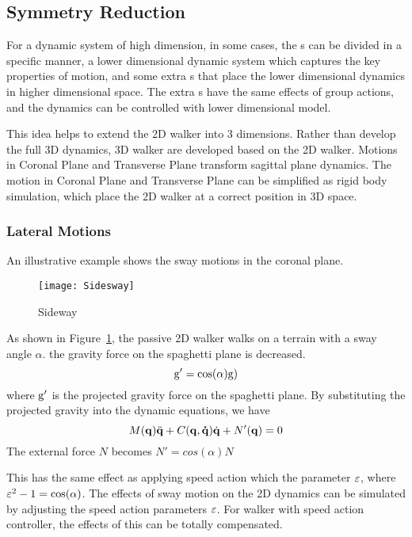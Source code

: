 {\subsection{Symmetry Reduction}
For a dynamic system of high dimension, in some cases, the {\dof}s can be divided in a specific manner,
a lower dimensional dynamic system which captures the key properties of motion, 
and some extra {\dof}s that place the lower dimensional dynamics in higher dimensional space.
The extra {\dof}s have the same effects of group actions, and the dynamics can be controlled with lower dimensional model.



This idea helps to extend the 2D walker into 3 dimensions.
Rather than develop the full 3D dynamics, 3D walker are developed based on the 2D walker.
Motions in Coronal Plane and Transverse Plane transform sagittal plane dynamics.
The motion in Coronal Plane and Transverse Plane can be simplified as rigid body simulation, which place the 2D walker at a correct position in 3D space.

\subsubsection*{Lateral Motions}
An illustrative example shows the sway motions in the coronal plane.

\begin{figure}[!htbp]
  \begin{center}
      \texttt{[image: Sidesway]}
    \caption{Sideway}
    \label{fig:sidesway}
\end{center}
\end{figure}

As shown in Figure~\ref{fig:sidesway}, the passive 2D walker walks on a terrain with a sway angle $\alpha$.
the gravity force on the spaghetti plane is decreased.
\[
\mathrm{g}'=\cos(\alpha)\mathrm{g})
\]
where $\mathrm{g}'$ is the projected gravity force on the spaghetti plane.
By substituting the projected gravity into the dynamic equations, we have
\begin{equation}
\label{eq:flyequation}
M(\mathbf{q}) \ddot{\mathbf{q}} + C(\mathbf{q,\dot{q}})\dot{\mathbf{q}} + N'(\mathbf{q}) = 0
\end{equation}
The external force $N$ becomes $N'=cos(\alpha)N$

This has the same effect as applying speed action which the parameter $\varepsilon$, where $\varepsilon^2-1=\cos(\alpha)$.
The effects of sway motion on the 2D dynamics can be simulated by adjusting the speed action parameters $\varepsilon$.
For walker with speed action controller, the effects of this {\dof} can be totally compensated.

}
